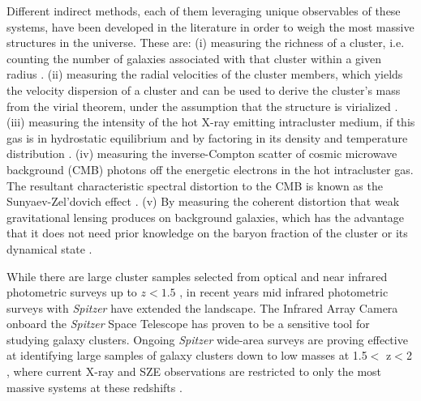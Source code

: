 \documentclass[apj,twocolumn]{emulateapj}
\begin{document}
Different indirect methods, each of them leveraging unique observables of these systems, have been developed in the literature in order to weigh the most massive structures in the universe. These 
are:
(i) measuring the richness of a cluster, i.e. counting the number of galaxies associated with that cluster within a given radius \citep[e.g.,][]{Abell58, Zwicky68, Carlberg96, Yee99, Yee03, Rozo09, Rykoff12, Rykoff14, Andreon14, Andreon15, Andreon16, Saro15}. (ii) measuring the radial velocities of the cluster members, which yields the velocity dispersion of a cluster and can be used to derive the cluster's mass from the virial theorem, under the assumption that the structure is virialized \citep[e.g.,][]{Girardi96, Mercurio03, Demarco05, Demarco07}. (iii) measuring the intensity of the hot X-ray emitting
intracluster medium, if this gas is in hydrostatic equilibrium and by factoring in its density and temperature distribution \citep[e.g.,][]{Gioia90, Vikhlinin98, Bohringer00, Pacaud07, Suhada12, Ettori13}. (iv) measuring the inverse-Compton scatter of cosmic microwave background (CMB) photons off the energetic electrons in the hot intracluster gas. The resultant characteristic spectral distortion to the CMB is known as the Sunyaev-Zel'dovich effect \citep[SZE,][]{Sunyaev72, Staniszewski09, Hasselfield13, Planck15, Bleem15}. (v) By measuring the coherent distortion that weak gravitational lensing produces on background galaxies, which has the advantage that it does not need prior knowledge on the baryon fraction of the cluster or its dynamical state \citep[e.g.,][]{Bartelmann01,Hoekstra07, Mahdavi08, High12, Hoekstra12, vonderLinden14, Umetsu14, Sereno15}.

While there are large cluster samples selected from optical and near infrared photometric surveys up to $z<1.5$ \citep[e.g.,][]{Gladders00, Koester07, Menanteau10, Hao10, Brodwin11, Wen12, Rykoff14, Ascaso14, Bleem15a}, in recent years mid infrared photometric surveys with {\it Spitzer} have extended the landscape. 
The Infrared Array Camera \citep[IRAC,][]{Fazio04} onboard the {\it Spitzer} Space Telescope has proven to be a sensitive tool for studying galaxy clusters. Ongoing {\it Spitzer} wide-area surveys are proving effective at identifying large samples of galaxy clusters down to low masses at 1.5$<$ z$ < $2 \citep[e.g.,SDWFS, SWIRE, CARLA, SSDF;][]{Eisenhardt08,Papovich08,Wilson09,Demarco10,Galametz10,Stanford12,Zeimann12,Brodwin13,Galametz13,Muzzin13,Wylezalek13,Rettura14}, where current X-ray and SZE observations are restricted to only the most massive systems at these redshifts \citep{Brodwin11, Muzzin13}. 
\end{document}
